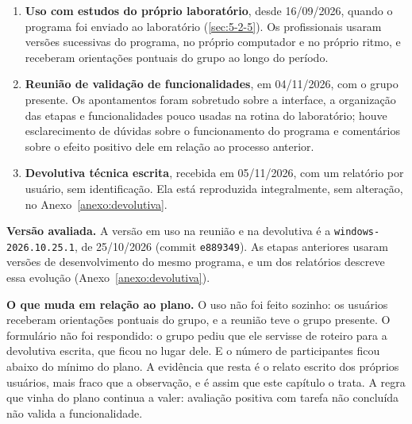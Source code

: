\begin{enumerate}
\item \textbf{Uso com estudos do próprio laboratório}, desde 16/09/2026, quando o programa foi enviado ao laboratório (\ref{sec:5-2-5}). Os profissionais usaram versões sucessivas do programa, no próprio computador e no próprio ritmo, e receberam orientações pontuais do grupo ao longo do período.
\item \textbf{Reunião de validação de funcionalidades}, em 04/11/2026, com o grupo presente. Os apontamentos foram sobretudo sobre a interface, a organização das etapas e funcionalidades pouco usadas na rotina do laboratório; houve esclarecimento de dúvidas sobre o funcionamento do programa e comentários sobre o efeito positivo dele em relação ao processo anterior.
\item \textbf{Devolutiva técnica escrita}, recebida em 05/11/2026, com um relatório por usuário, sem identificação. Ela está reproduzida integralmente, sem alteração, no Anexo~\ref{anexo:devolutiva}.
\end{enumerate}


\textbf{Versão avaliada.} A versão em uso na reunião e na devolutiva é a \texttt{windows-\allowbreak{}2026.\allowbreak{}10.\allowbreak{}25.\allowbreak{}1}, de 25/10/2026 (commit \texttt{e889349}). As etapas anteriores usaram versões de desenvolvimento do mesmo programa, e um dos relatórios descreve essa evolução (Anexo~\ref{anexo:devolutiva}).


\textbf{O que muda em relação ao plano.} O uso não foi feito sozinho: os usuários receberam orientações pontuais do grupo, e a reunião teve o grupo presente. O formulário não foi respondido: o grupo pediu que ele servisse de roteiro para a devolutiva escrita, que ficou no lugar dele. E o número de participantes ficou abaixo do mínimo do plano. A evidência que resta é o relato escrito dos próprios usuários, mais fraco que a observação, e é assim que este capítulo o trata. A regra que vinha do plano continua a valer: avaliação positiva com tarefa não concluída não valida a funcionalidade.

